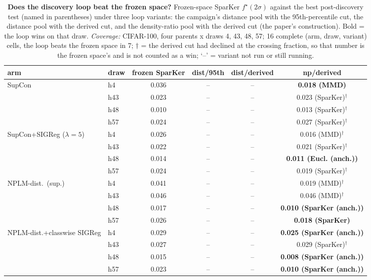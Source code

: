\begin{table}[t]
\centering
\footnotesize
\begin{tabular}{llcccc}
\toprule
arm & draw & frozen SparKer & dist/95th & dist/derived & np/derived \\
\midrule
SupCon & h4 & 0.036 & -- & -- & \textbf{0.018 (MMD)} \\
 & h43 & 0.023 & -- & -- & 0.023 (SparKer)$^\dagger$ \\
 & h48 & 0.010 & -- & -- & 0.013 (SparKer)$^\dagger$ \\
 & h57 & 0.024 & -- & -- & 0.027 (SparKer)$^\dagger$ \\
\addlinespace
SupCon+SIGReg ($\lambda{=}5$) & h4 & 0.026 & -- & -- & 0.016 (MMD)$^\dagger$ \\
 & h43 & 0.022 & -- & -- & 0.021 (SparKer)$^\dagger$ \\
 & h48 & 0.014 & -- & -- & \textbf{0.011 (Eucl. (anch.))} \\
 & h57 & 0.024 & -- & -- & 0.019 (SparKer)$^\dagger$ \\
\addlinespace
NPLM-dist.\ (sup.) & h4 & 0.041 & -- & -- & 0.019 (MMD)$^\dagger$ \\
 & h43 & 0.046 & -- & -- & 0.046 (MMD)$^\dagger$ \\
 & h48 & 0.017 & -- & -- & \textbf{0.010 (SparKer (anch.))} \\
 & h57 & 0.026 & -- & -- & \textbf{0.018 (SparKer)} \\
\addlinespace
NPLM-dist.+classwise SIGReg & h4 & 0.029 & -- & -- & \textbf{0.025 (SparKer (anch.))} \\
 & h43 & 0.027 & -- & -- & 0.029 (SparKer)$^\dagger$ \\
 & h48 & 0.015 & -- & -- & \textbf{0.008 (SparKer (anch.))} \\
 & h57 & 0.023 & -- & -- & \textbf{0.010 (SparKer (anch.))} \\
\bottomrule
\end{tabular}
\caption{\textbf{Does the discovery loop beat the frozen space?} Frozen-space SparKer $f^\star(2\sigma)$ against the best post-discovery test (named in parentheses) under three loop variants: the campaign's distance pool with the 95th-percentile cut, the distance pool with the derived cut, and the density-ratio pool with the derived cut (the paper's construction). Bold = the loop wins on that draw. \emph{Coverage:} CIFAR-100, four parents x draws {4, 43, 48, 57}; 16 complete (arm, draw, variant) cells, the loop beats the frozen space in 7; $\dagger$ = the derived cut had declined at the crossing fraction, so that number is the frozen space's and is not counted as a win; `--' = variant not run or still running.}
\label{tab:sigma_summary_cifar100}
\end{table}
